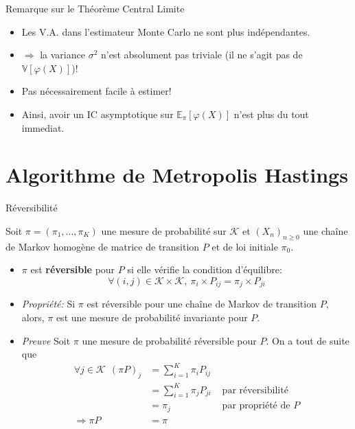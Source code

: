 \documentclass[9pt,ignorenonframetext,]{beamer}
\providecommand{\tightlist}{%
  \setlength{\itemsep}{0pt}\setlength{\parskip}{0pt}}
\newcommand{\V}{\mathbb{V}}
\newcommand{\K}{\mathcal{K}}
\begin{document}
\begin{frame}{Remarque sur le Théorème Central Limite}
\protect\hypertarget{remarque-sur-le-thuxe9oruxe8me-central-limite}{}

\begin{itemize}
\tightlist
\item
  Les V.A. dans l'estimateur Monte Carlo ne sont plus indépendantes.
\item
  \(\Rightarrow\) la variance \(\sigma^2\) n'est absolument pas triviale
  (il ne s'agit pas de \(\V[\varphi(X)]\))!
\item
  Pas nécessairement facile à estimer!
\item
  Ainsi, avoir un IC asymptotique sur \(\mathbb{E}_\pi[\varphi(X)]\)
  n'est plus du tout immediat.
\end{itemize}

\end{frame}

\hypertarget{algorithme-de-metropolis-hastings}{%
\section{Algorithme de Metropolis
Hastings}\label{algorithme-de-metropolis-hastings}}

\begin{frame}{Réversibilité}
\protect\hypertarget{ruxe9versibilituxe9}{}

Soit \(\pi =(\pi_1,\dots, \pi_K)\) une mesure de probabilité sur \(\K\)
et \((X_n)_{n\geq 0}\) une chaîne de Markov homogène de matrice de
transition \(P\) et de loi initiale \(\pi_0\).\pause 

\begin{itemize}
\item
  \(\pi\) est \textbf{réversible} pour \(P\) si elle vérifie la
  condition d'équilibre:
  \[\forall (i, j) \in \K\times \K,~\pi_i \times P_{ij} = \pi_j \times P_{ji}\]
\item
  \emph{Propriété:} Si \(\pi\) est réversible pour une chaîne de Markov
  de transition \(P\), alors, \(\pi\) est une mesure de probabilité
  invariante pour \(P\).\pause
\item
  \emph{Preuve} Soit \(\pi\) une mesure de probabilité réversible pour
  \(P\). On a tout de suite que \begin{align*}
  \forall j \in \K~~(\pi P)_j & = \sum_{i = 1}^{K} \pi_i P_{ij}& \\
  &= \sum_{i = 1}^{K} \pi_j P_{ji} &\text{ par réversibilité}\\
  &= \pi_j &\text{ par propriété de } P\\
  \Rightarrow \pi P &= \pi&
  \end{align*}
\end{itemize}

\end{frame}
\end{document}
